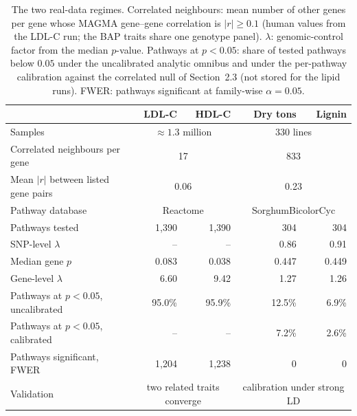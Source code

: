 \begin{table}[!t]
\centering
\caption{The two real-data regimes. Correlated neighbours: mean number of other genes per gene whose MAGMA gene--gene correlation is $|r|\ge0.1$ (human values from the LDL-C run; the BAP traits share one genotype panel). $\lambda$: genomic-control factor from the median $p$-value. Pathways at $p<0.05$: share of tested pathways below $0.05$ under the uncalibrated analytic omnibus and under the per-pathway calibration against the correlated null of Section~2.3 (not stored for the lipid runs). FWER: pathways significant at family-wise $\alpha=0.05$.}
\label{tab:sorghum_regimes}
\small
\begin{tabular}{lrrrr}
\hline
 & \textbf{LDL-C} & \textbf{HDL-C} & \textbf{Dry tons} & \textbf{Lignin} \\
\hline
Samples & \multicolumn{2}{c}{$\approx1.3$ million} & \multicolumn{2}{c}{330 lines} \\
Correlated neighbours per gene & \multicolumn{2}{c}{17} & \multicolumn{2}{c}{833} \\
Mean $|r|$ between listed gene pairs & \multicolumn{2}{c}{0.06} & \multicolumn{2}{c}{0.23} \\
Pathway database & \multicolumn{2}{c}{Reactome} & \multicolumn{2}{c}{SorghumBicolorCyc} \\
Pathways tested & 1{,}390 & 1{,}390 & 304 & 304 \\
SNP-level $\lambda$ & -- & -- & 0.86 & 0.91 \\
Median gene $p$ & 0.083 & 0.038 & 0.447 & 0.449 \\
Gene-level $\lambda$ & 6.60 & 9.42 & 1.27 & 1.26 \\
Pathways at $p<0.05$, uncalibrated & 95.0\% & 95.9\% & 12.5\% & 6.9\% \\
Pathways at $p<0.05$, calibrated & -- & -- & 7.2\% & 2.6\% \\
Pathways significant, FWER & 1{,}204 & 1{,}238 & 0 & 0 \\
Validation & \multicolumn{2}{c}{two related traits converge} & \multicolumn{2}{c}{calibration under strong LD} \\
\hline
\end{tabular}
\end{table}
